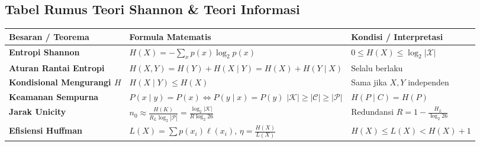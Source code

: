 \documentclass[11pt,a4paper]{article}
\begin{document}
\subsection{Tabel Rumus Teori Shannon \& Teori Informasi}
\begin{table}[H]
\centering
\small
\begin{tabular}{p{4.5cm} p{7.5cm} p{3.5cm}}
\toprule
\textbf{Besaran / Teorema} & \textbf{Formula Matematis} & \textbf{Kondisi / Interpretasi} \\
\midrule
\textbf{Entropi Shannon} & $H(X) = -\sum_{x} p(x) \log_2 p(x)$ & $0 \le H(X) \le \log_2 |\mathcal{X}|$ \\
\midrule
\textbf{Aturan Rantai Entropi} & $H(X, Y) = H(Y) + H(X \mid Y) = H(X) + H(Y \mid X)$ & Selalu berlaku \\
\midrule
\textbf{Kondisional Mengurangi $H$} & $H(X \mid Y) \le H(X)$ & Sama jika $X, Y$ independen \\
\midrule
\textbf{Keamanan Sempurna} & $P(x \mid y) = P(x) \iff P(y \mid x) = P(y)$ \newline $|\mathcal{K}| \ge |\mathcal{C}| \ge |\mathcal{P}|$ & $H(P \mid C) = H(P)$ \\
\midrule
\textbf{Jarak Unicity} & $n_0 \approx \frac{H(K)}{R_L \log_2 |\mathcal{P}|} = \frac{\log_2 |\mathcal{K}|}{R \log_2 26}$ & Redundansi $R = 1 - \frac{H_L}{\log_2 26}$ \\
\midrule
\textbf{Efisiensi Huffman} & $L(X) = \sum p(x_i) \ell(x_i)$, \quad $\eta = \frac{H(X)}{L(X)}$ & $H(X) \le L(X) < H(X) + 1$ \\
\bottomrule
\end{tabular}
\end{table}
\end{document}
